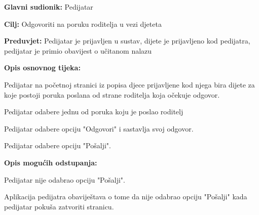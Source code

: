 					\noindent {}
					\begin{packed_item}
						
						\item \textbf{Glavni sudionik: }Pedijatar
						\item  \textbf{Cilj:} Odgovoriti na poruku roditelja u vezi djeteta
						\item  \textbf{Preduvjet:} Pedijatar je prijavljen u sustav, dijete je prijavljeno kod pedijatra, pedijatar je primio obavijest o učitanom nalazu
						\item  \textbf{Opis osnovnog tijeka:}
						
						\item[] \begin{packed_enum}
							
							\item Pedijatar na početnoj stranici iz popisa djece prijavljene kod njega bira dijete za koje postoji poruka poslana od strane roditelja koja očekuje odgovor.
							\item Pedijatar odabere jednu od poruka koju je poslao roditelj
							\item Pedijatar odabere opciju "Odgovori" i sastavlja svoj odgovor.
							\item Pedijatar odabere opciju "Pošalji".
						\end{packed_enum}
						
						\item  \textbf{Opis mogućih odstupanja:}
						
						\item[] \begin{packed_item}
							
							\item[4.a] Pedijatar nije odabrao opciju "Pošalji".
							\item[] \begin{packed_enum}
								
								\item Aplikacija pedijatra obaviještava o tome da nije odabrao opciju "Pošalji" kada pedijatar pokuša zatvoriti stranicu.
							\end{packed_enum}
							
							
						\end{packed_item}
						
						
					\end{packed_item}
					
